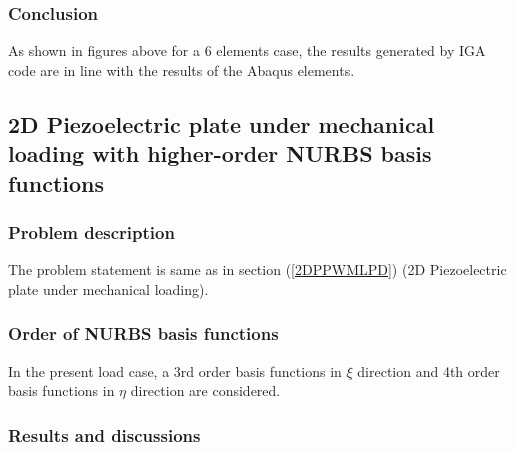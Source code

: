 \documentclass[11pt]{article}
\begin{document}
\subsubsection{Conclusion}
As shown in figures above for a 6 elements case, the results generated by IGA code are in line with the results of the Abaqus elements.  

\subsection{2D Piezoelectric plate under mechanical loading with higher-order NURBS basis functions }
\subsubsection{Problem description}

The problem statement is same as in section (\ref{2DPPWMLPD}) (2D Piezoelectric plate under mechanical loading).

\subsubsection{Order of NURBS basis functions}
In the present load case, a 3rd order basis functions in $\xi$ direction and 4th order basis functions in $\eta$ direction are considered.

\subsubsection{Results and discussions}
\end{document}
